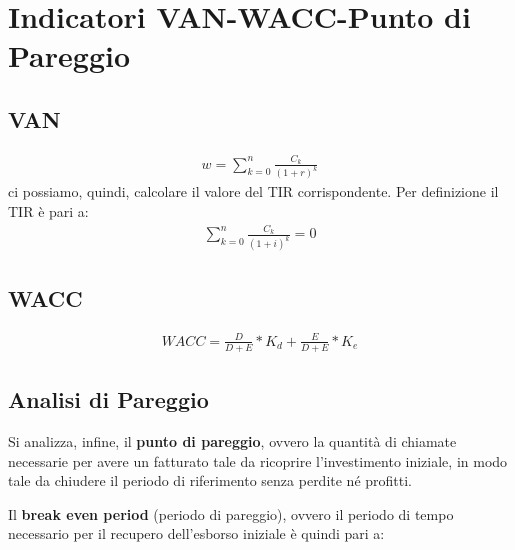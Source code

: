 \chapter[Indicatori VAN-WACC-Punto di Pareggio]{Indicatori VAN-WACC-Punto di Pareggio}
\section[VAN]{VAN}
	\begin{equation}
	\label{eq:van}
	\begin{split}
 		w = \sum_{k=0}^n \frac{C_k}{(1+r)^k}
	\end{split}
	\end{equation}
	ci possiamo, quindi, calcolare il valore del \ac{TIR} corrispondente. Per definizione il \ac{TIR} è pari a:
	\begin{equation}
	\label{eq:tir}
	\begin{split}
 		\sum_{k=0}^n \frac{C_k}{(1+i)^k} = 0
	\end{split}
	\end{equation}	 
\section[WACC]{WACC}
	\begin{equation}
	\label{eq:wacc}
	\begin{split}
		WACC = \frac{D}{D+E} * K_d + \frac{E}{D+E} * K_e 
	\end{split}
	\end{equation}
\section[Analisi di Pareggio]{Analisi di Pareggio}
Si analizza, infine, il \textbf{punto di pareggio}, ovvero la quantità di chiamate necessarie per avere un fatturato tale da ricoprire l'investimento iniziale, in modo tale da chiudere il periodo di riferimento senza perdite né profitti.

Il \textbf{break even period} (periodo di pareggio), ovvero il periodo di tempo necessario per il recupero dell'esborso iniziale è quindi pari a:   	